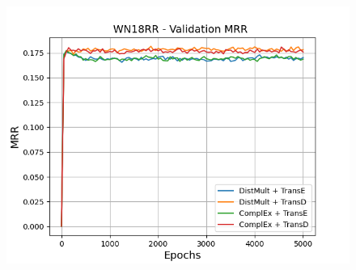 \begin{figure}
\begin{minipage}{.3\textwidth}
    \end{minipage}
    \begin{minipage}{.3\textwidth}
      \centering
      \includegraphics[width=\linewidth]{figures/results/gan_train/not_pretrained/uncertainty/max_distribution/entropy/wn18rr/5k_epochs/uncertainty_wn18rr_mrrs.png}
    \end{minipage}%
    

\end{figure}
